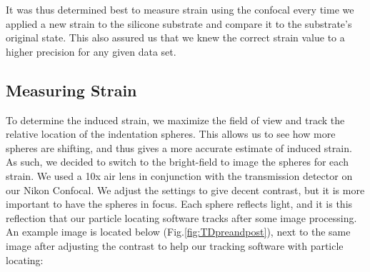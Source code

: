 It was thus determined best to measure strain using the confocal every time we applied a new strain to the silicone substrate and compare it to the substrate's original state. This also assured us that we knew the correct strain value to a higher precision for any given data set.


\subsection{Measuring Strain}
To determine the induced strain, we maximize the field of view and track the relative location of the indentation spheres. This allows us to see how more spheres are shifting, and thus gives a more accurate estimate of induced strain. As such, we decided to switch to the bright-field to image the spheres for each strain. We used a 10x air lens in conjunction with the transmission detector on our Nikon Confocal. We adjust the settings to give decent contrast, but it is more important to have the spheres in focus. Each sphere reflects light, and it is this reflection that our particle locating software tracks after some image processing. An example image is located below (Fig.\ref{fig:TDpreandpost}), next to the same image after adjusting the contrast to help our tracking software with particle locating: 
